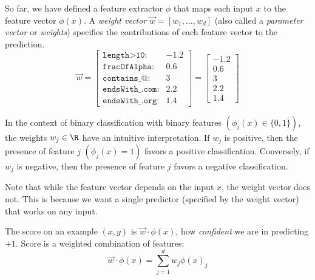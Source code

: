 \label{par:weight_vector}
So far, we have defined a feature extractor $\phi$ that maps each input $x$ to the feature vector $\phi(x)$.
A \textit{weight vector} $\vec{w} = [w_1, \dots, w_d]$ (also called a \textit{parameter vector} or \textit{weights})
specifies the contributions of each feature vector to the prediction.
\[
\vec{w} = \begin{bmatrix}
\texttt{length>10}: & -1.2\\
\texttt{fracOfAlpha}: & 0.6\\
\texttt{contains\_@}: & 3\\
\texttt{endsWith\_.com}: & 2.2\\
\texttt{endsWith\_.org}: & 1.4
\end{bmatrix} = \begin{bmatrix}
-1.2\\
0.6\\
3\\
2.2\\
1.4
\end{bmatrix}
\]

In the context of binary classification with binary features
$(\phi_j(x) \in \{0,1\})$, the weights $w_j \in \R$ have an intuitive interpretation.
If $w_j$ is positive, then the presence of feature $j$ $(\phi_j(x) = 1)$ favors a positive classification.
Conversely, if $w_j$ is negative, then the presence of feature $j$ favors a negative classification.

Note that while the feature vector depends on the input $x$, the weight vector does not.
This is because we want a single predictor (specified by the weight vector) that works on any input.




\begin{example}

    The score on an example $(x,y)$ is $\vec{w}\cdot \phi(x)$, how \textit{confident} we are in predicting $+1$. Score is a weighted combination of features:
    \[
        \vec{w} \cdot \phi(x) = \sum_{j=1}^d w_j \phi(x)_j
    \]
\end{example}

